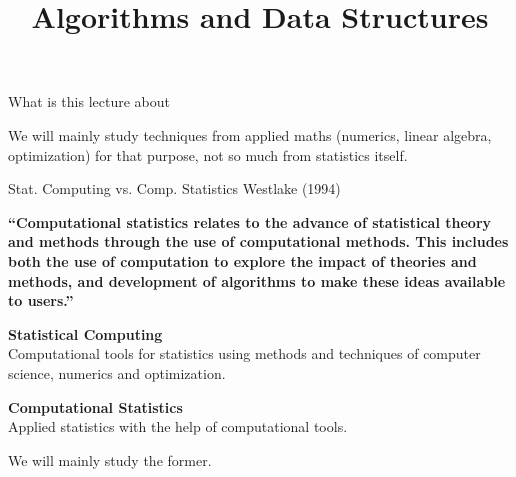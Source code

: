\documentclass[11pt,compress,t,notes=noshow, xcolor=table]{beamer}
\title{Algorithms and Data Structures}
\begin{document}

\begin{vbframe}{What is this lecture about}

\lz

We will mainly study techniques from applied maths (numerics, linear algebra, optimization) for that purpose,
not so much from statistics itself.

\end{vbframe}

\begin{vbframe}{Stat. Computing vs. Comp. Statistics}
Westlake (1994)

\textbf{\enquote{Computational statistics relates to the advance
  of statistical theory and methods through the use of computational
  methods. This includes both the use of computation to explore the
  impact of theories and methods, and development of algorithms to
  make these ideas available to users.}}

\lz
\textbf{Statistical Computing}\\
Computational tools for statistics using methods and techniques of computer science, numerics and optimization.

\bigskip

\textbf{Computational Statistics}\\
Applied statistics with the help of computational tools.

\lz

We will mainly study the former.

\end{vbframe}




\end{document}
